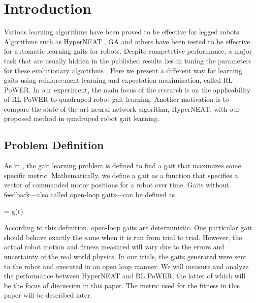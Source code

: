 \section{Introduction}


Various learning algorithms have been proved to be effective for
legged robots. Algorithms such as HyperNEAT \cite{yosinski2011evolving-robot-gaits},
GA \cite{chernova2004an-evolutionary-approach-to-gait} and others \cite{hornby2005autonomous-evolution-of-dynamic} \cite{zykov2004evolving-dynamic-gaits} \cite{tellez2006evolving-the-walking-behaviour} \cite{valsalam2008modular-neuroevolution-for-multilegged} have been tested to be effective for automatic learning gaits for robots. Despite competetive performance, a major
task that are usually hidden in the published results lies in tuning the parameters for
these evolutionary algorithms \cite{kormushev2011bipedal-walking-energy}. Here we present a
different way for learning gaits using reinforcement learning and expectation maximization, called RL PoWER. In our
experiment, the main focus of the research is on the applicability of RL PoWER to quadruped robot gait learning. Another motivation is to compare the state-of-the-art neural network algorithm, HyperNEAT, with our proposed method in quadruped robot gait learning.

\subsection{Problem Definition}

As in \cite{yosinski2011evolving-robot-gaits}, the gait learning problem is defined to find a
gait that maximizes some specific metric. Mathematically, we define a
gait as a function that specifies a vector of commanded motor
positions for a robot over time. Gaits without feedback---also
called open-loop gaits---can be defined as 

\be{} = g(t)\ee

According to this definition, open-loop gaits are deterministic. One
particular gait should behave exactly the same when it is run from
trial to trial. However, the actual robot motion and fitness measured
will vary due to the errors and uncertainty of the real world physics. In our
trials, the gaits generated were sent to the robot and
executed in an open loop manner. We will measure and analyze the performance between HyperNEAT and 
RL PoWER, the latter of which will be the focus of discussion in this paper. The metric used for the fitness in this paper will be
described later.
